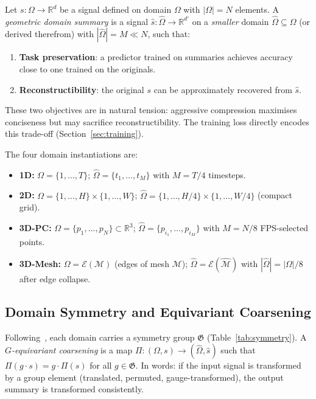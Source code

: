 \documentclass[10pt,conference]{IEEEtran}
\newcommand{\R}{\mathbb{R}}
\newcommand{\fG}{\mathfrak{G}}
\begin{document}
Let $s\colon\Omega\to\R^d$ be a signal defined on domain $\Omega$ with
$|\Omega|=N$ elements.  A \emph{geometric domain summary} is a signal
$\hat{s}\colon\hat{\Omega}\to\R^{d'}$ on a \emph{smaller} domain
$\hat{\Omega}\subseteq\Omega$ (or derived therefrom) with $|\hat{\Omega}|
= M \ll N$, such that:
\begin{enumerate}
  \item \textbf{Task preservation}: a predictor trained on summaries
    achieves accuracy close to one trained on the originals.
  \item \textbf{Reconstructibility}: the original $s$ can be
    approximately recovered from $\hat{s}$.
\end{enumerate}
These two objectives are in natural tension: aggressive compression
maximises conciseness but may sacrifice reconstructibility.  The training
loss directly encodes this trade-off (Section~\ref{sec:training}).

The four domain instantiations are:
\begin{itemize}
  \item \textbf{1D:} $\Omega=\{1,\ldots,T\}$;
    $\hat{\Omega}=\{t_1,\ldots,t_M\}$ with $M=T/4$ timesteps.
  \item \textbf{2D:} $\Omega=\{1,\ldots,H\}\times\{1,\ldots,W\}$;
    $\hat{\Omega}=\{1,\ldots,H/4\}\times\{1,\ldots,W/4\}$ (compact grid).
  \item \textbf{3D-PC:} $\Omega=\{p_1,\ldots,p_N\}\subset\R^3$;
    $\hat{\Omega}=\{p_{i_1},\ldots,p_{i_M}\}$ with $M=N/8$ FPS-selected points.
  \item \textbf{3D-Mesh:} $\Omega=\mathcal{E}(\mathcal{M})$ (edges of mesh
    $\mathcal{M}$); $\hat{\Omega}=\mathcal{E}(\hat{\mathcal{M}})$ with
    $|\hat{\Omega}|=|\Omega|/8$ after edge collapse.
\end{itemize}

\subsection{Domain Symmetry and Equivariant Coarsening}

Following~\cite{bronstein2021geometric}, each domain carries a symmetry
group $\fG$ (Table~\ref{tab:symmetry}).  A \emph{$G$-equivariant
coarsening} is a map $\Pi\colon(\Omega,s)\to(\hat{\Omega},\hat{s})$ such
that $\Pi(g\cdot s) = g\cdot\Pi(s)$ for all $g\in\fG$.  In words: if the
input signal is transformed by a group element (translated, permuted,
gauge-transformed), the output summary is transformed consistently.
\end{document}
